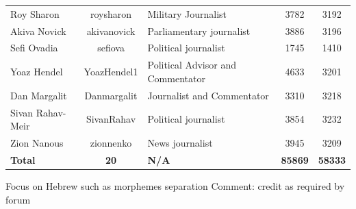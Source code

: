 \documentclass[a4paper]{article}
\begin{document}
\begin{table}[htbp]
\begin{tabular}{lcp{5.715em}cc}
    Roy Sharon & \multicolumn{1}{p{7.57em}}{roysharon} & Military Journalist & 3782  & 3192 \\
    Akiva Novick & \multicolumn{1}{p{7.57em}}{akivanovick} & Parliamentary journalist & 3886  & 3196 \\
    Sefi Ovadia & \multicolumn{1}{p{7.57em}}{sefiova} & Political journalist & 1745  & 1410 \\
    Yoaz Hendel & \multicolumn{1}{p{7.57em}}{YoazHendel1} & Political Advisor and Commentator & 4633  & 3201 \\
    Dan Margalit & \multicolumn{1}{p{7.57em}}{Danmargalit} & Journalist and Commentator & 3310  & 3218 \\
    Sivan Rahav-Meir & \multicolumn{1}{p{7.57em}}{SivanRahav} & Political journalist & 3854  & 3232 \\
    Zion Nanous & \multicolumn{1}{p{7.57em}}{zionnenko} & News journalist & 3945  & 3209 \\
    \textbf{Total} & \textbf{20} & \textbf{N/A} & \textbf{85869} & \textbf{58333} \\
    \end{tabular}%
  \label{tab:datastats}%
\end{table}%
Focus on Hebrew such as morphemes separation
Comment: credit as required by forum
\pagebreak
\end{document}
